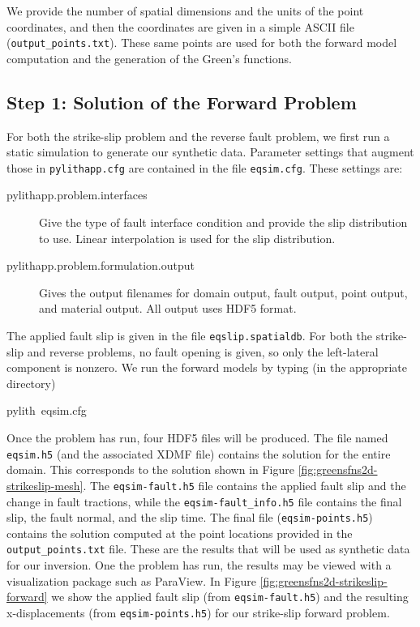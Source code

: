 We provide the number of spatial dimensions and the units of the point
coordinates, and then the coordinates are given in a simple ASCII
file (\texttt{output\_points.txt}). These same points are used for
both the forward model computation and the generation of the Green's
functions.


\subsection{Step 1: Solution of the Forward Problem}

For both the strike-slip problem and the reverse fault problem, we
first run a static simulation to generate our synthetic data. Parameter
settings that augment those in \texttt{pylithapp.cfg} are contained
in the file \texttt{eqsim.cfg}. These settings are:
\begin{description}
\item [{pylithapp.problem.interfaces}] Give the type of fault interface
condition and provide the slip distribution to use. Linear interpolation
is used for the slip distribution.
\item [{pylithapp.problem.formulation.output}] Gives the output filenames
for domain output, fault output, point output, and material output.
All output uses HDF5 format.
\end{description}
The applied fault slip is given in the file \texttt{eqslip.spatialdb}.
For both the strike-slip and reverse problems, no fault opening is
given, so only the left-lateral component is nonzero. We run the forward
models by typing (in the appropriate directory)
\begin{lyxcode}
pylith~eqsim.cfg
\end{lyxcode}
Once the problem has run, four HDF5 files will be produced. The file
named \texttt{eqsim.h5} (and the associated XDMF file) contains the
solution for the entire domain. This corresponds to the solution shown
in Figure \vref{fig:greensfns2d-strikeslip-mesh}. The \texttt{eqsim-fault.h5}
file contains the applied fault slip and the change in fault tractions,
while the \texttt{eqsim-fault\_info.h5} file contains the final slip,
the fault normal, and the slip time. The final file (\texttt{eqsim-points.h5})
contains the solution computed at the point locations provided in
the \texttt{output\_points.txt} file. These are the results that will
be used as synthetic data for our inversion. One the problem has run,
the results may be viewed with a visualization package such as ParaView.
In Figure \vref{fig:greensfns2d-strikeslip-forward} we show the applied
fault slip (from \texttt{eqsim-fault.h5}) and the resulting x-displacements
(from \texttt{eqsim-points.h5}) for our strike-slip forward problem.

